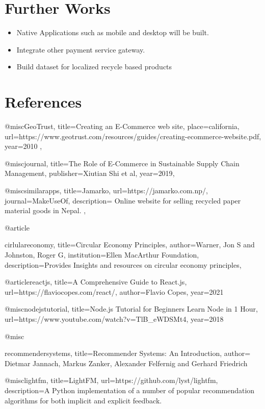 \documentclass[12pt, a4paper, oneside]{article}
\begin{document}
\pagebreak


\section{Further Works}

\begin{itemize}
   \item {Native Applications such as mobile and desktop will be built.}
   \item {Integrate other payment service gateway.}
   \item {Build dataset for localized recycle based products }
   
\end{itemize}
\pagebreak


\section{References}


@misc{GeoTrust,
title={Creating an E-Commerce web site},
place={california},
url={https://www.geotrust.com/resources/guides/creating-ecommerce-website.pdf},
year={2010}
},

@misc{journal,
title={The Role of E-Commerce in Sustainable Supply Chain Management},
publisher={Xiutian Shi et al},
year={2019},
}

@misc{similarapps,
title={Jamarko},
url={https://jamarko.com.np/},
journal={MakeUseOf},
description={
Online website for selling recycled paper material goods in Nepal.
},
}

@article{cirlulareconomy,
  title={Circular Economy Principles},
  author={Warner, Jon S and Johnston, Roger G},
  institution={Ellen MacArthur Foundation},
  description={Provides Insights and resources on circular economy principles},

}

@article{reactjs,
title={A Comprehensive Guide to React.js},
url={https://flaviocopes.com/react/},
author={Flavio Copes},
year={2021}
}


@misc{nodejstutorial,
title={Node.js Tutorial for Beginners  Learn Node in 1 Hour},
url={https://www.youtube.com/watch?v=TlB\_eWDSMt4},
year={2018}
}

@misc{recommendersystems,
title={Recommender Systems: An Introduction},
author={ Dietmar Jannach, Markus Zanker, Alexander Felfernig and Gerhard Friedrich }

@misc{lightfm,
title={LightFM},
url={https://github.com/lyst/lightfm},
description={A Python implementation of a number of popular recommendation algorithms for both implicit and explicit feedback.}
}

}
\end{document}
